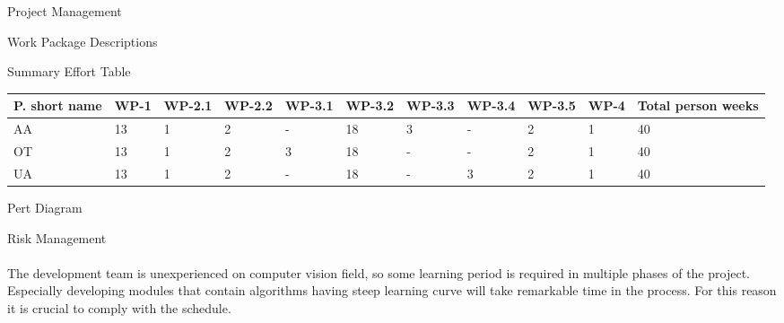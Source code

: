 \documentclass[12pt, a4paper]{article} \pagenumbering{gobble}
\begin{document}
\begin{section}{Project Management}
\begin{subsubsection}{Work Package Descriptions}
\end{subsubsection}
\newpage
\begin{subsubsection}{Summary Effort Table}
  \begin{tabularx}{\textwidth}{|*{11}{Y|}}
   \hline
   \textbf{P. short name} & \textbf{WP-1} & \textbf{WP-2.1} & \textbf{WP-2.2} & \textbf{WP-3.1} & \textbf{WP-3.2} & \textbf{WP-3.3} & \textbf{WP-3.4} & \textbf{WP-3.5} & \textbf{WP-4} & \textbf{Total person weeks} \\
   \hline
   AA & 13 & 1 & 2 & - & 18 & 3 &  - & 2 & 1 & 40 \\
   \hline
   OT & 13 & 1 & 2 & 3 & 18 & - &  - & 2 & 1 & 40\\
   \hline
   UA & 13 & 1 & 2 & - & 18 & - &  3 & 2 & 1 & 40\\
  \hline
 \end{tabularx}
\end{subsubsection}
\newpage
\begin{subsection}{Pert Diagram}
\end{subsection}
\newpage
\begin{subsection}{Risk Management}
  \paragraph{}{%
  The development team is unexperienced on computer vision field, so some learning
  period is required in multiple phases of the project. Especially developing modules that contain algorithms
  having steep learning curve will take remarkable time in the process. For this reason it is crucial to comply with
  the schedule.\\
  }
\end{subsection}
\end{section}

\newpage
\end{document}
